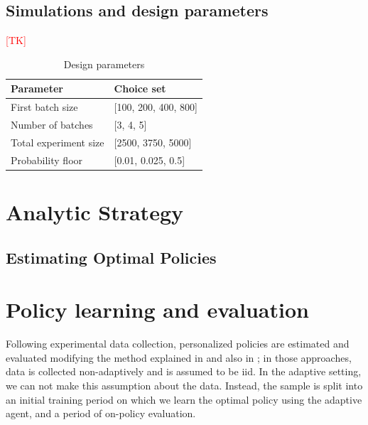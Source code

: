 \documentclass[letterpaper, 12pt, parskip=full,]{scrartcl}
\begin{document}
\subsection{Simulations and design parameters}

\textcolor{red}{[TK]}

\begin{table}[H]
\centering
\caption{Design parameters} 
\label{tab:design}
\begin{tabular}{l | l}
\textbf{Parameter} & \textbf{Choice set} \\ \hline
First batch size & [100, 200, 400, 800] \\
Number of batches & [3, 4, 5] \\
Total experiment size & [2500, 3750, 5000] \\
Probability floor & [0.01, 0.025, 0.5]\\
\hline
\end{tabular}
\end{table} 

\section{Analytic Strategy}

\subsection{Estimating Optimal Policies}



\section{Policy learning and evaluation}

Following experimental data collection, personalized policies are estimated and evaluated modifying the method explained in \cite{athey2017efficient} and also in \cite{zhou2018offline}; in those approaches, data is collected non-adaptively and is assumed to be iid. In the adaptive setting, we can not make this assumption about the data. Instead, the sample is split into an initial training period on which we learn the optimal policy using the adaptive agent, and a period of on-policy evaluation. 
\end{document}
